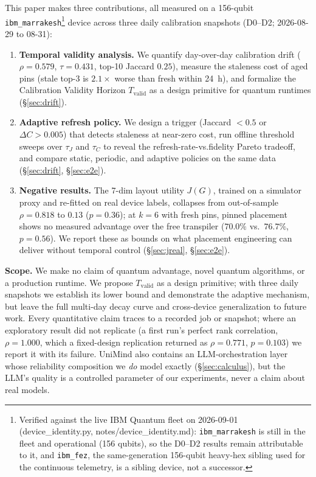 \documentclass[journal,10pt,twocolumn]{IEEEtran}
\begin{document}
This paper makes three contributions, all measured on a 156-qubit \texttt{ibm\_marrakesh}\footnote{Verified
against the live IBM Quantum fleet on 2026-09-01 (device\_identity.py, notes/device\_identity.md):
\texttt{ibm\_marrakesh} is still in the fleet and operational (156 qubits), so the D0--D2 results remain attributable
to it, and \texttt{ibm\_fez}, the same-generation 156-qubit heavy-hex sibling used for the continuous telemetry, is a
sibling device, not a successor.} device across three
daily calibration snapshots (D0--D2; 2026-08-29 to 08-31):
\begin{enumerate}[leftmargin=1.8em,itemsep=1pt,topsep=2pt]
\item \textbf{Temporal validity analysis.} We quantify day-over-day calibration drift
($\rho{=}0.579$, $\tau{=}0.431$, top-10 Jaccard $0.25$), measure the staleness cost of aged pins
(stale top-3 is $2.1\times$ worse than fresh within 24~h), and formalize the Calibration Validity
Horizon $T_{\mathrm{valid}}$ as a design primitive for quantum runtimes (\S\ref{sec:drift}).
\item \textbf{Adaptive refresh policy.} We design a trigger (Jaccard $<0.5$ or $\Delta C{>}0.005$)
that detects staleness at near-zero cost, run offline threshold sweeps over $\tau_J$ and $\tau_C$ to
reveal the refresh-rate-vs.\-fidelity Pareto tradeoff, and compare static, periodic, and adaptive
policies on the same data (\S\ref{sec:drift}, \S\ref{sec:e2e}).
\item \textbf{Negative results.} The 7-dim layout utility $J(G)$, trained on a simulator proxy and
re-fitted on real device labels, collapses from out-of-sample $\rho{=}0.818$ to $0.13$
($p{=}0.36$); at $k{=}6$ with fresh pins, pinned placement shows no measured advantage over the
free transpiler ($70.0\%$ vs.\ $76.7\%$, $p{=}0.56$). We report these as bounds on what placement
engineering can deliver without temporal control (\S\ref{sec:jreal}, \S\ref{sec:e2e}).
\end{enumerate}

\noindent\textbf{Scope.} We make no claim of quantum advantage, novel quantum algorithms, or a production runtime.
We propose $T_{\mathrm{valid}}$ as a design primitive; with three daily snapshots we establish its lower bound and
demonstrate the adaptive mechanism, but leave the full multi-day decay curve and cross-device generalization to
future work. Every quantitative claim traces to a recorded job or snapshot; where an exploratory result did
not replicate (a first run's perfect rank correlation, $\rho{=}1.000$, which a fixed-design replication returned as
$\rho{=}0.771$, $p{=}0.103$) we report it with its failure. UniMind also contains an LLM-orchestration layer whose
reliability composition we \emph{do} model exactly (\S\ref{sec:calculus}), but the LLM's quality is a controlled
parameter of our experiments, never a claim about real models.
\end{document}
